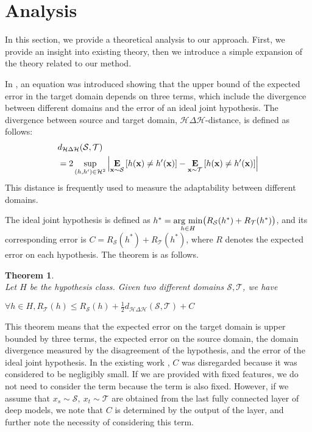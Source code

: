\documentclass{article}
\newcommand{\argmin}{\mathop{\rm arg~min}\limits}
\newtheorem{theorem}{Theorem}
\newcommand{\hdistance}{\mathcal{H}\Delta\mathcal{H}}
\begin{document}
\section{Analysis}
In this section, we provide a theoretical analysis to our approach. First, we provide an insight into existing theory, then we introduce a simple expansion of the theory related to our method.

In \cite{ben2010theory}, an equation was introduced showing that the upper bound of the expected error in the target domain depends on three terms, which include the divergence between different domains and the error of an ideal joint hypothesis. 
The divergence between source and target domain, $\mathcal{H} \Delta \mathcal{H}$-distance, is defined as follows:
\begin{equation*}
\begin{split}
&d_{{\hdistance}}(\mathcal{S},\mathcal{T}) \\
& =2\sup_{(h,h^{\prime})\in \mathcal{H}^{2}} \left| \underset{{\bf x}\sim \mathcal{S}}{\mathbf{E}} \left[h({\bf x}) \neq h^{\prime}({\bf x}) \right] - \underset{{\bf x}\sim \mathcal{T}}{\mathbf{E}} \left[h({\bf x}) \neq h^{\prime}({\bf x}) \right]\right|
\end{split}
\end{equation*}
This distance is frequently used to measure the adaptability between different domains.

The ideal joint hypothesis is defined as $h^{*}= \argmin_{h\in H}\bigl(R_{\mathcal{S}}(h^{*})+R_{\mathcal{T}}(h^{*})\bigr)$, and its corresponding error is $C=R_{\mathcal{S}}(h^{*})+R_{\mathcal{T}}(h^{*})$, where $R$ denotes the expected error on each hypothesis.
The theorem is as follows.
\begin{theorem}\upshape \cite{ben2010theory}\\
Let $H$ be the hypothesis class. Given two different domains $\mathcal{S}, \mathcal{T}$, we have

\begin{math}
\forall h  \in H, R_{\mathcal{T}}(h) \leq R_{\mathcal{S}}(h)  +\frac{1}{2}{d_{\mathcal{H} \Delta \mathcal{H}}(\mathcal{S},\mathcal{T})}+C
\end{math}
\label{th:thm1}
\end{theorem}
This theorem means that the expected error on the target domain is upper bounded by three terms, the expected error on the source domain, the domain divergence measured by the disagreement of the hypothesis, and the error of the ideal joint hypothesis.
In the existing work \cite{ganin2014unsupervised,long2015learning}, $C$ was disregarded because it was considered to be negligibly small. If we are provided with fixed features, we do not need to consider the term because the term is also fixed.
However, if we assume that $x_s \sim \mathcal{S}, \ x_t \sim \mathcal{T}$ are obtained from the last fully connected layer of deep models, we note that $C$ is determined by the output of the layer, and further note the necessity of considering this term.
\end{document}
